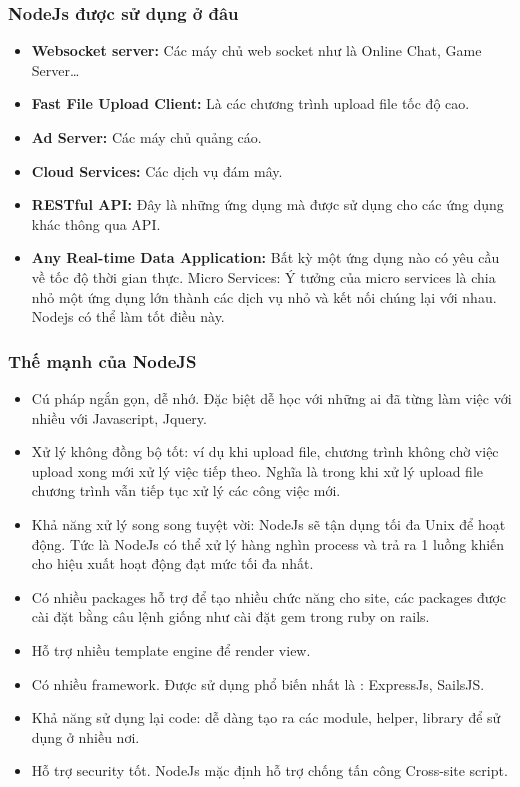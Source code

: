 \subsubsection{NodeJs được sử dụng ở đâu}
\begin{itemize}
  \item \textbf{Websocket server:} Các máy chủ web socket như là Online Chat, Game Server…
  \item \textbf{Fast File Upload Client:} Là các chương trình upload file tốc độ cao.
  \item \textbf{Ad Server:} Các máy chủ quảng cáo.
  \item \textbf{Cloud Services:} Các dịch vụ đám mây.
  \item \textbf{RESTful API:} Đây là những ứng dụng mà được sử dụng cho các ứng dụng khác thông qua API.
  \item \textbf{Any Real-time Data Application:} Bất kỳ một ứng dụng nào có yêu cầu về tốc độ thời gian thực. Micro Services: Ý tưởng của micro services là chia nhỏ một ứng dụng lớn thành các dịch vụ nhỏ và kết nối chúng lại với nhau. Nodejs có thể làm tốt điều này.
\end{itemize}

\subsubsection{Thế mạnh của NodeJS}
\begin{itemize}
  \item Cú pháp ngắn gọn, dễ nhớ. Đặc biệt dễ học với những ai đã từng làm việc với nhiều với Javascript, Jquery.
  \item Xử lý không đồng bộ tốt: ví dụ khi upload file, chương trình không chờ việc upload xong mới xử lý việc tiếp theo. Nghĩa là trong khi xử lý upload file chương trình vẫn tiếp tục xử lý các công việc mới.
  \item Khả năng xử lý song song tuyệt vời: NodeJs sẽ tận dụng tối đa Unix để hoạt động. Tức là NodeJs có thể xử lý hàng nghìn process và trả ra 1 luồng khiến cho hiệu xuất hoạt động đạt mức tối đa nhất.
  \item Có nhiều packages hỗ trợ để tạo nhiều chức năng cho site, các packages được cài đặt bằng câu lệnh giống như cài đặt gem trong ruby on rails.
  \item Hỗ trợ nhiều template engine để render view.
  \item Có nhiều framework. Được sử dụng phổ biến nhất là : ExpressJs, SailsJS.
  \item Khả năng sử dụng lại code: dễ dàng tạo ra các module, helper, library để sử dụng ở nhiều nơi.
  \item Hỗ trợ security tốt. NodeJs mặc định hỗ trợ chống tấn công Cross-site script.
\end{itemize}

